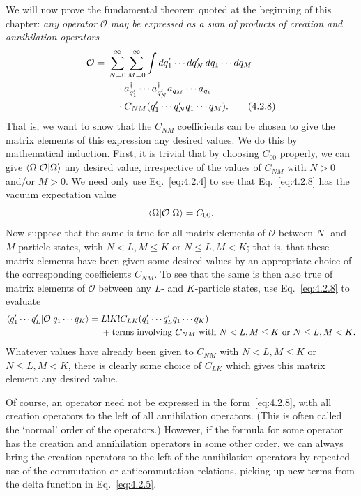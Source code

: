 We will now prove the fundamental theorem quoted at the beginning
of this chapter: \textit{any operator $\mathcal O$ may be expressed as a sum of products of
creation and annihilation operators}
\begin{align}
  \mathcal O={}&\sum_{N=0}^{\infty}\sum_{M=0}^{\infty}
  \int dq'_1\cdots dq'_N\,dq_1\cdots dq_M
  \notag\\
  &\quad\cdot a^\dagger_{q'_1}\cdots a^\dagger_{q'_N}
  a_{q_M}\cdots a_{q_1}
  \notag\\
  &\quad\cdot C_{NM}(q'_1\cdots q'_N q_1\cdots q_M).
  \tag{4.2.8}
  \label{eq:4.2.8}
\end{align}
That is, we want to show that the $C_{NM}$ coefficients can be chosen to give
the matrix elements of this expression any desired values. We do this by
mathematical induction. First, it is trivial that by choosing $C_{00}$ properly,
we can give $\langle \Omega\rvert\mathcal O\lvert \Omega\rangle$ any desired value, irrespective of the values of $C_{NM}$
with $N>0$ and/or $M>0$. We need only use Eq.~\eqref{eq:4.2.4} to see that
Eq.~\eqref{eq:4.2.8} has the vacuum expectation value
\[
  \langle \Omega\rvert\mathcal O\lvert \Omega\rangle=C_{00}.
\]
Now suppose that the same is true for all matrix elements of $\mathcal O$ between
$N$- and $M$-particle states, with $N<L,M\leq K$ or $N\leq L,M<K$; that
is, that these matrix elements have been given some desired values by
an appropriate choice of the corresponding coefficients $C_{NM}$. To see that
the same is then also true of matrix elements of $\mathcal O$ between any $L$- and
$K$-particle states, use Eq.~\eqref{eq:4.2.8} to evaluate
\begin{align*}
  \langle q'_1\cdots q'_L\rvert\mathcal O\lvert q_1\cdots q_K\rangle
  ={}& L!K!C_{LK}(q'_1\cdots q'_L q_1\cdots q_K)
  \\
  &+\text{terms involving $C_{NM}$ with $N<L,M\leq K$ or $N\leq L,M<K$.}
\end{align*}
Whatever values have already been given to $C_{NM}$ with $N<L,M\leq K$
or $N\leq L,M<K$, there is clearly some choice of $C_{LK}$ which gives this
matrix element any desired value.

Of course, an operator need not be expressed in the form~\eqref{eq:4.2.8}, with
all creation operators to the left of all annihilation operators. (This
is often called the `normal' order of the operators.) However, if the
formula for some operator has the creation and annihilation operators
in some other order, we can always bring the creation operators to the
left of the annihilation operators by repeated use of the commutation or
anticommutation relations, picking up new terms from the delta function
in Eq.~\eqref{eq:4.2.5}.

